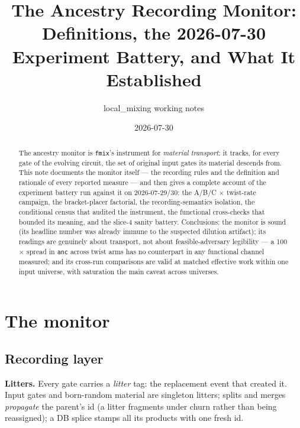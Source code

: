 \documentclass[11pt]{article}
\title{The Ancestry Recording Monitor:\\
Definitions, the 2026-07-30 Experiment Battery, and What It Established}
\author{local\_mixing working notes}
\date{2026-07-30}
\newcommand{\code}[1]{\texttt{#1}}
\begin{document}
\maketitle

\begin{abstract}
The ancestry monitor is \code{fmix}'s instrument for \emph{material
transport}: it tracks, for every gate of the evolving circuit, the set of
original input gates its material descends from. This note documents the
monitor itself --- the recording rules and the definition and rationale of
every reported measure --- and then gives a complete account of the
experiment battery run against it on 2026-07-29/30: the A/B/C
$\times$ twist-rate campaign, the bracket-placer factorial, the
recording-semantics isolation, the conditional census that audited the
instrument, the functional cross-checks that bounded its meaning, and the
slice-4 sanity battery. Conclusions: the monitor is sound (its headline
number was already immune to the suspected dilution artifact); its readings
are genuinely about transport, not about feasible-adversary legibility ---
a 100$\times$ spread in \code{anc} across twist arms has no counterpart in
any functional channel measured; and its cross-run comparisons are valid at
matched effective work within one input universe, with saturation the main
caveat across universes.
\end{abstract}

\section{The monitor}

\subsection{Recording layer}

\textbf{Litters.} Every gate carries a \emph{litter} tag: the replacement
event that created it. Input gates and born-random material are singleton
litters; splits and merges \emph{propagate} the parent's id (a litter
fragments under churn rather than being reassigned); a DB splice stamps all
its products with one fresh id.
\end{document}
